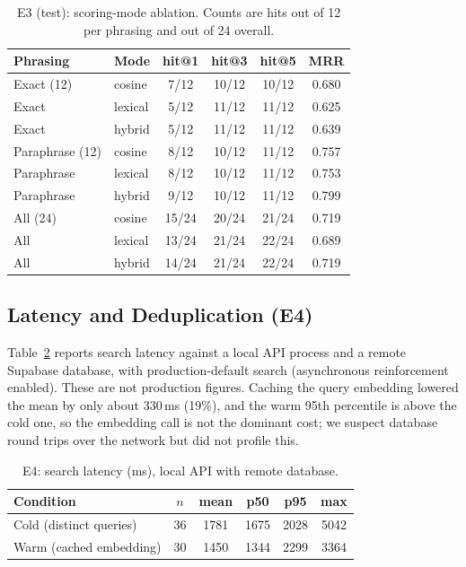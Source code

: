 \documentclass[conference]{IEEEtran}
\begin{document}
\begin{table}[t]
\caption{E3 (test): scoring-mode ablation. Counts are hits out of 12 per
phrasing and out of 24 overall.}
\label{tab:e3}
\centering\footnotesize
\begin{tabular}{@{}llcccc@{}}
\toprule
Phrasing & Mode & hit@1 & hit@3 & hit@5 & MRR \\
\midrule
Exact (12)      & cosine  & 7/12 & 10/12 & 10/12 & 0.680 \\
Exact           & lexical & 5/12 & 11/12 & 11/12 & 0.625 \\
Exact           & hybrid  & 5/12 & 11/12 & 11/12 & 0.639 \\
\midrule
Paraphrase (12) & cosine  & 8/12 & 10/12 & 11/12 & 0.757 \\
Paraphrase      & lexical & 8/12 & 10/12 & 11/12 & 0.753 \\
Paraphrase      & hybrid  & 9/12 & 10/12 & 11/12 & 0.799 \\
\midrule
All (24)        & cosine  & 15/24 & 20/24 & 21/24 & 0.719 \\
All             & lexical & 13/24 & 21/24 & 22/24 & 0.689 \\
All             & hybrid  & 14/24 & 21/24 & 22/24 & 0.719 \\
\bottomrule
\end{tabular}
\end{table}

\subsection{Latency and Deduplication (E4)}
Table~\ref{tab:e4} reports search latency against a local API process and a
remote Supabase database, with production-default search (asynchronous
reinforcement enabled). These are not production figures. Caching the query
embedding lowered the mean by only about 330\,ms (19\%), and the warm 95th
percentile is above the cold one, so the embedding call is not the dominant cost;
we suspect database round trips over the network but did not profile this.

\begin{table}[t]
\caption{E4: search latency (ms), local API with remote database.}
\label{tab:e4}
\centering\footnotesize
\begin{tabular}{@{}lccccc@{}}
\toprule
Condition & $n$ & mean & p50 & p95 & max \\
\midrule
Cold (distinct queries) & 36 & 1781 & 1675 & 2028 & 5042 \\
Warm (cached embedding) & 30 & 1450 & 1344 & 2299 & 3364 \\
\bottomrule
\end{tabular}
\end{table}
\end{document}
